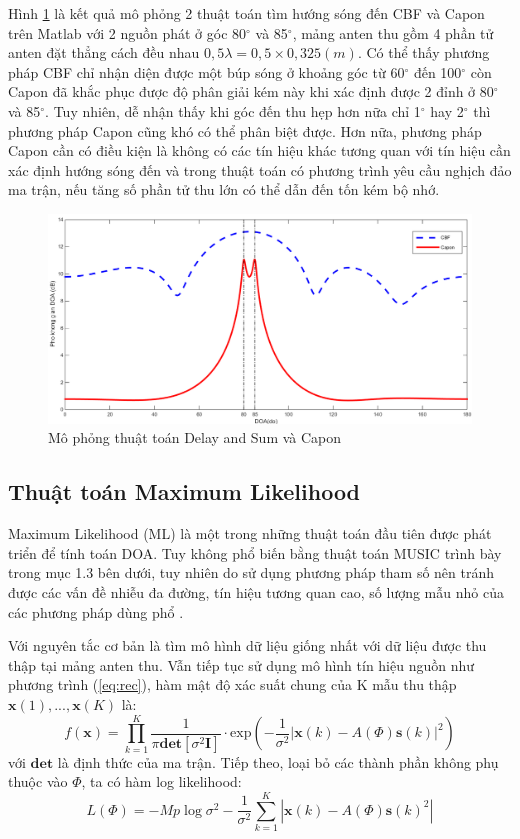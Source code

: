 Hình \ref{fig:CBFvsCapon} là kết quả mô phỏng 2 thuật toán tìm hướng sóng đến CBF và Capon trên Matlab với 2 nguồn phát ở góc 80$^{\circ}$ và 85$^{\circ}$, mảng anten thu gồm 4 phần tử anten đặt thẳng cách đều nhau  $0,5\lambda = 0,5 \times 0,325 (m)$. Có thể thấy phương pháp CBF chỉ nhận diện được một búp sóng ở khoảng góc từ 60$^{\circ}$ đến 100$^{\circ}$ còn Capon đã khắc phục được độ phân giải kém này khi xác định được 2 đỉnh ở 80$^{\circ}$ và 85$^{\circ}$. Tuy nhiên, dễ nhận thấy khi góc đến thu hẹp hơn nữa chỉ 1$^{\circ}$ hay 2$^{\circ}$ thì phương pháp Capon cũng khó có thể phân biệt được. Hơn nữa, phương pháp Capon cần có điều kiện là không có các tín hiệu khác tương quan với tín hiệu cần xác định hướng sóng đến và trong thuật toán có phương trình yêu cầu nghịch đảo ma trận, nếu tăng số phần tử thu lớn có thể dẫn đến tốn kém bộ nhớ.
\begin{figure} [!htb]
	\centering
	\includegraphics[width=1\linewidth]{figures/CBFvsCapon.png}
	\caption{Mô phỏng thuật toán Delay and Sum và Capon}
	\label{fig:CBFvsCapon}
\end{figure}

\subsection{Thuật toán Maximum Likelihood}

Maximum Likelihood (ML) là một trong những thuật toán đầu tiên được phát triển để tính toán DOA. Tuy không phổ biến bằng thuật toán MUSIC trình bày trong mục 1.3 bên dưới, tuy nhiên do sử dụng phương pháp tham số nên tránh được các vấn đề nhiễu đa đường, tín hiệu tương quan cao, số lượng mẫu nhỏ của các phương pháp dùng phổ \cite{Ziskind1988}.

Với nguyên tắc cơ bản là tìm mô hình dữ liệu giống nhất với dữ liệu được thu thập tại mảng anten thu. Vẫn tiếp tục sử dụng mô hình tín hiệu nguồn như phương trình (\ref{eq:rec}), hàm mật độ xác suất chung của K mẫu thu thập $\mathbf{x}(1), ..., \mathbf{x}(K)$  là:
\begin{equation}
	\mathit{f}(\mathbf{x}) = \prod_{k=1}^{K}\frac{1}{\pi\mathbf{det}[\sigma^2\mathbf{I}]} \cdot  \mathrm{exp}(-\frac{1}{\sigma^2}|\mathbf{x}(k) - A(\Phi)\mathbf{s}(k)|^2)
\end{equation}
với $\mathbf{det}$ là định thức của ma trận. Tiếp theo, loại bỏ các thành phần không phụ thuộc vào $\Phi$, ta có hàm  log likelihood:
\begin{equation}
	L(\Phi) = -Mp\log\sigma^2 - \frac{1}{\sigma^2}\sum_{k=1}^{K}|\mathbf{x}(k) - A(\Phi)\mathbf{s}(k)^2|
\end{equation}

